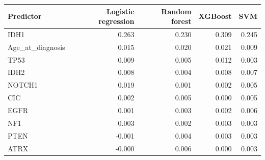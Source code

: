 \begin{tabular}{lrrrr}
\toprule
\textbf{Predictor} & \textbf{Logistic regression} & \textbf{Random forest} & \textbf{XGBoost} & \textbf{SVM} \\
\midrule
IDH1 & 0.263 & 0.230 & 0.309 & 0.245 \\
Age\_at\_diagnosis & 0.015 & 0.020 & 0.021 & 0.009 \\
TP53 & 0.009 & 0.005 & 0.012 & 0.003 \\
IDH2 & 0.008 & 0.004 & 0.008 & 0.007 \\
NOTCH1 & 0.019 & 0.001 & 0.002 & 0.005 \\
CIC & 0.002 & 0.005 & 0.000 & 0.005 \\
EGFR & 0.001 & 0.003 & 0.002 & 0.006 \\
NF1 & 0.003 & 0.002 & 0.003 & 0.003 \\
PTEN & -0.001 & 0.004 & 0.003 & 0.003 \\
ATRX & -0.000 & 0.006 & 0.000 & 0.003 \\
\bottomrule
\end{tabular}
